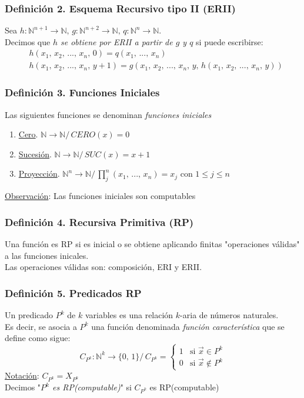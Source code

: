 \documentclass{article}
\newcommand{\comma}{,\,}                                %
\newcommand{\tq}{/\,}                                   %
\newcommand{\naturales}{\mathbb{N}}                     %
\begin{document}
\subsubsection*{Definición 2. Esquema Recursivo tipo II (ERII)}
Sea $h: \naturales^{n+1} \rightarrow \naturales \comma g: \naturales^{n+2} \rightarrow \naturales \comma q: \naturales^n \rightarrow \naturales$.
\\Decimos que \emph{$h$ se obtiene por ERII a partir de $g$ y $q$} si puede escribirse:
\begin{align*}
    &h(x_1 \comma x_2 \comma ... \comma x_n \comma 0) = q(x_1 \comma ... \comma x_n) \\
    &h(x_1 \comma x_2 \comma ... \comma x_n \comma y+1) = g(x_1 \comma x_2 \comma ... \comma x_n \comma y \comma h(x_1 \comma x_2 \comma ... \comma x_n \comma y))
\end{align*}

\subsubsection*{Definición 3. Funciones Iniciales}
Las siguientes funciones se denominan \emph{funciones iniciales}
\begin{enumerate}
    \item \underline{Cero}. $\naturales \rightarrow \naturales \tq CERO(x) = 0$
    \item \underline{Sucesión}. $\naturales \rightarrow \naturales \tq SUC(x) = x+1$
    \item \underline{Proyección}. $\naturales^n \rightarrow \naturales \tq \prod^n_j (x_1 \comma ... \comma x_n) = x_j$ con $1 \leq j \leq n$
\end{enumerate}
\underline{Observación}: Las funciones iniciales son computables

\subsubsection*{Definición 4. Recursiva Primitiva (RP)}
Una función es RP si es inicial o se obtiene aplicando finitas "operaciones válidas" a las funciones inicales.
\\Las operaciones válidas son: composición, ERI y ERII.

\subsubsection*{Definición 5. Predicados RP}
Un predicado $P^k$ de $k$ variables es una relación $k$-aria de números naturales.
\\Es decir, se asocia a $P^k$ una función denominada \emph{función característica} que se define como sigue:
\begin{equation*}
    C_{P^k}: \naturales^k \rightarrow \{ 0 \comma 1 \} \tq C_{P^k} = \begin{cases}
        1 &\text{si } \Vec{x} \in P^k \\
        0 &\text{si } \Vec{x} \notin P^k
    \end{cases}
\end{equation*}
\underline{Notación}: $C_{P^k} = X_{P^k}$
\\Decimos "\emph{$P^k$ es RP(computable)}" si $C_{P^k}$ es RP(computable)
\end{document}
